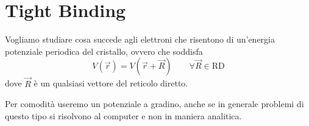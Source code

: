 \section{Tight Binding}
                                                                                            
Vogliamo studiare cosa succede agli elettroni che risentono di     
  un'energia potenziale periodica del cristallo, ovvero che soddisfa                         
  \begin{equation}                                                                           
      V(\vec{r}) = V(\vec{r} + \vec{R}) \qquad \forall \vec{R} \in \text{RD}                
  \end{equation}                                                                             
  dove \( \vec{R} \) è un qualsiasi vettore del reticolo diretto.                            
                                                                                             
  Per comodità useremo un potenziale a gradino, anche se in generale problemi di questo tipo 
  si risolvono al computer e non in maniera analitica.
                                                                                             

